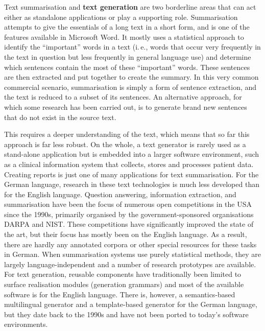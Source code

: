 \documentclass[]{../../metanetpaper}
\begin{document}
\begin{multicols}{2}
    Text summarisation and \textbf{text generation} are two borderline areas that can act either as standalone applications or play a supporting role. Summarisation attempts to give the essentials of a long text in a short form, and is one of the features available in Microsoft Word. It mostly uses a statistical approach to identify the “important” words in a text (i.\,e., words that occur very frequently in the text in question but less frequently in general language use) and determine which sentences contain the most of these “important” words. These sentences are then extracted and put together to create the summary. In this very common commercial scenario, summarisation is simply a form of sentence extraction, and the text is reduced to a subset of its sentences. An alternative approach, for which some research has been carried out, is to generate brand new sentences that do not exist in the source text. 


This requires a deeper understanding of the text, which means that so far this approach is far less robust. On the whole, a text generator is rarely used as a stand-alone application but is embedded into a larger software environment, such as a clinical information system that collects, stores and processes patient data. Creating reports is just one of many applications for text summarisation. 
For the German language, research in these text technologies is much less developed than for the English language. Question answering, information extraction, and summarisation have been the focus of numerous open competitions in the USA since the 1990s, primarily organised by the government-sponsored organisations DARPA and NIST. These competitions have significantly improved the state of the art, but their focus has mostly been on the English language. As a result, there are hardly any annotated corpora or other special resources for these tasks in German. When summarisation systems use purely statistical methods, they are largely language-independent and a number of research prototypes are available. For text generation, reusable components have traditionally been limited to surface realisation modules (generation grammars) and most of the available software is for the English language. There is, however, a semantics-based multilingual generator and a template-based generator for the German language, but they date back to the 1990s and have not been ported to today’s software environments.


\end{multicols}
\end{document}

